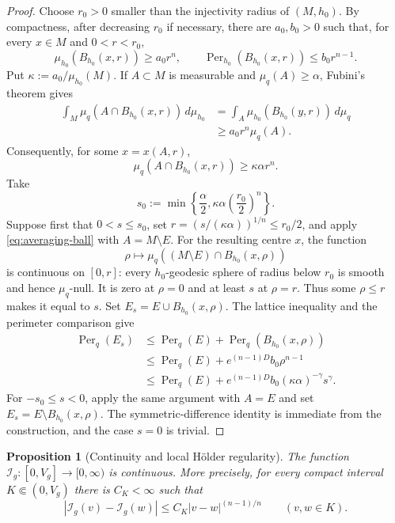 \documentclass[11pt]{amsart}
\newtheorem{proposition}[theorem]{Proposition}
\theoremstyle{definition}
\theoremstyle{remark}
\newcommand{\Per}{\operatorname{Per}}
\newcommand{\dmu}[1]{\,d\mu_{#1}}
\newcommand{\cI}{\mathcal I}
\begin{document}
\begin{proof}
Choose $r_0>0$ smaller than the injectivity radius of $(M,h_0)$.  By
compactness, after decreasing $r_0$ if necessary, there are $a_0,b_0>0$ such
that, for every $x\in M$ and $0<r<r_0$,
\[
 \mu_{h_0}(B_{h_0}(x,r))\geq a_0r^n,
 \qquad
 \Per_{h_0}(B_{h_0}(x,r))\leq b_0r^{n-1}.
\]
Put $\kappa:=a_0/\mu_{h_0}(M)$.  If $A\subset M$ is measurable and
$\mu_q(A)\geq\alpha$, Fubini's theorem gives
\begin{align*}
 \int_M\mu_q(A\cap B_{h_0}(x,r))\dmu{h_0}
 &=\int_A\mu_{h_0}(B_{h_0}(y,r))\dmu q\\
 &\geq a_0r^n\mu_q(A).
\end{align*}
Consequently, for some $x=x(A,r)$,
\begin{equation}\label{eq:averaging-ball}
 \mu_q(A\cap B_{h_0}(x,r))\geq\kappa\alpha r^n.
\end{equation}
Take
\[
 s_0:=\min\left\{\frac{\alpha}{2},
       \kappa\alpha\left(\frac{r_0}{2}\right)^n\right\}.
\]
Suppose first that $0<s\leq s_0$, set
$r=(s/(\kappa\alpha))^{1/n}\leq r_0/2$, and apply
\eqref{eq:averaging-ball} with $A=M\setminus E$.  For the resulting centre
$x$, the function
\[
 \rho\longmapsto
 \mu_q((M\setminus E)\cap B_{h_0}(x,\rho))
\]
is continuous on $[0,r]$: every $h_0$-geodesic sphere of radius below $r_0$
is smooth and hence $\mu_q$-null.  It is zero at $\rho=0$ and at least $s$ at
$\rho=r$.  Thus some $\rho\leq r$ makes it equal to $s$.  Set
$E_s=E\cup B_{h_0}(x,\rho)$.  The lattice inequality and the perimeter
comparison give
\begin{align*}
 \Per_q(E_s)
 &\leq\Per_q(E)+\Per_q(B_{h_0}(x,\rho))\\
 &\leq\Per_q(E)+e^{(n-1)D}b_0\rho^{n-1}\\
 &\leq\Per_q(E)+e^{(n-1)D}b_0
       (\kappa\alpha)^{-\gamma}s^\gamma.
\end{align*}
For $-s_0\leq s<0$, apply the same argument with $A=E$ and set
$E_s=E\setminus B_{h_0}(x,\rho)$.  The symmetric-difference identity is
immediate from the construction, and the case $s=0$ is trivial.
\end{proof}

\begin{proposition}[Continuity and local H\"older regularity]
\label{prop:profile-continuity}
The function $\cI_g:[0,V_g]\to[0,\infty)$ is continuous.  More precisely,
for every compact interval $K\Subset(0,V_g)$ there is $C_K<\infty$ such that
\begin{equation}\label{eq:profile-holder}
 |\cI_g(v)-\cI_g(w)|\leq C_K|v-w|^{(n-1)/n}
 \qquad(v,w\in K).
\end{equation}
\end{proposition}
\end{document}
